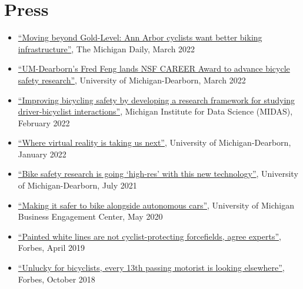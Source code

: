 \documentclass[11pt]{article}
\newenvironment{main}
{\begin{adjustwidth}{3em}{}}
{\end{adjustwidth}}
\begin{document}
\section*{Press}
\begin{main}

\begin{itemize}
    \item \href{https://www.michigandaily.com/news/moving-beyond-gold-level-ann-arbor-cyclists-want-better-biking-infrastructure/}{``Moving beyond Gold-Level: Ann Arbor cyclists want better biking infrastructure''}, The Michigan Daily, March 2022
    \item \href{https://umdearborn.edu/news/articles/um-dearborns-fred-feng-lands-nsf-career-award-advance-bicycle-safety-research}{``UM-Dearborn’s Fred Feng lands NSF CAREER Award to advance bicycle safety research''}, University of Michigan-Dearborn, March 2022
    \item \href{https://midas.umich.edu/improving-bicycling-safety/}{``Improving bicycling safety by developing a research framework for studying driver-bicyclist interactions''}, Michigan Institute for Data Science (MIDAS), February 2022
    \item \href{https://umdearborn.edu/news/articles/where-virtual-reality-taking-us-next}{``Where virtual reality is taking us next''}, University of Michigan-Dearborn, January 2022
    \item \href{https://umdearborn.edu/news/articles/bike-safety-research-going-high-res-new-technology}{``Bike safety research is going `high-res' with this new technology''}, University of Michigan-Dearborn, July 2021
    \item \href{http://umich.edu/~fredfeng/files/Making-it-safer-to-bike-alongside-autonomous-cars.pdf}{``Making it safer to bike alongside autonomous cars''}, University of Michigan Business Engagement Center, May 2020
    \item \href{https://www.forbes.com/sites/carltonreid/2019/04/16/painted-white-lines-are-not-cyclist-protecting-forcefields-agree-experts/}{``Painted white lines are not cyclist-protecting forcefields, agree experts''}, Forbes, April 2019
    \item \href{https://www.forbes.com/sites/carltonreid/2018/10/10/unlucky-for-bicyclists-every-13th-passing-motorist-is-looking-elsewhere/}{``Unlucky for bicyclists, every 13th passing motorist is looking elsewhere''}, Forbes, October 2018
\end{itemize}


\end{main}
\end{document}

